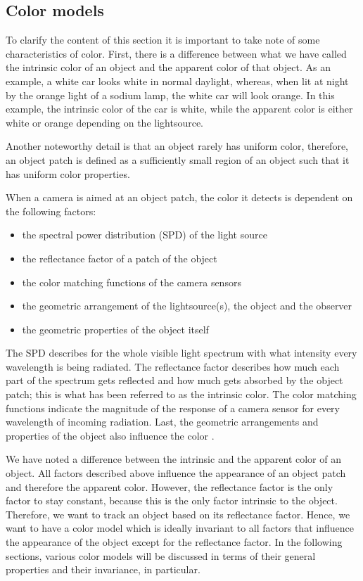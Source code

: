\documentclass[a4paper,11pt]{article}
\begin{document}
\subsection{Color models}

To clarify the content of this section it is important to take note of some characteristics of color. First, there is a difference between what we have called the intrinsic color of an object and the apparent color of that object. As an example, a white car looks white in normal daylight, whereas, when lit at night by the orange light of a sodium lamp, the white car will look orange. In this example, the intrinsic color of the car is white, while the apparent color is either white or orange depending on the lightsource.

Another noteworthy detail is that an object rarely has uniform color, therefore, an object patch is defined as a sufficiently small region of an object such that it has uniform color properties. 

When a camera is aimed at an object patch, the color it detects is dependent on the following factors: 
\begin{itemize}
\item the spectral power distribution (SPD) of the light source
\item the reflectance factor of a patch of the object
\item the color matching functions of the camera sensors 
\item the geometric arrangement of the lightsource(s), the object and the observer
\item the geometric properties of the object itself
\end{itemize}
The SPD describes for the whole visible light spectrum with what intensity every wavelength is being radiated. The reflectance factor describes how much each part of the spectrum gets reflected and how much gets absorbed by the object patch; this is what has been referred to as the intrinsic color. The color matching functions indicate the magnitude of the response of a camera sensor for every wavelength of incoming radiation. Last, the geometric arrangements and properties of the object also influence the color \cite{gevers_color}.

We have noted a difference between the intrinsic and the apparent color of an object. All factors described above influence the appearance of an object patch and therefore the apparent color. However, the reflectance factor is the only factor to stay constant, because this is the only factor intrinsic to the object. Therefore, we want to track an object based on its reflectance factor. Hence, we want to have a color model which is ideally invariant to all factors that influence the appearance of the object except for the reflectance factor. In the following sections, various color models will be discussed in terms of their general properties and their invariance, in particular. 
\end{document}
